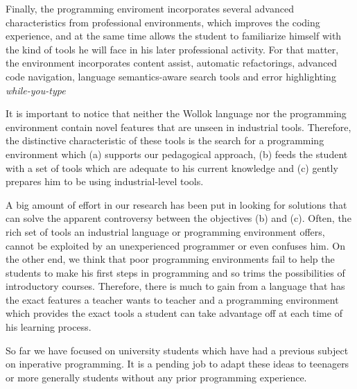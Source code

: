 Finally, the programming enviroment incorporates several advanced characteristics from professional environments, 
which improves the coding experience, and at the same time allows the student to familiarize himself with the kind of tools he will face in his later professional activity.
For that matter, the environment incorporates content assist, automatic refactorings, advanced code navigation, 
language semantics-aware search tools and error highlighting \emph{while-you-type}

\medskip
It is important to notice that neither the Wollok language nor the programming environment contain novel features that are unseen in industrial tools.
Therefore, the distinctive characteristic of these tools is the search for a programming environment which 
(a) supports our pedagogical approach,
(b) feeds the student with a set of tools which are adequate to his current knowledge
and (c) gently prepares him to be using industrial-level tools.

A big amount of effort in our research has been put in looking for solutions that can solve the apparent controversy between the objectives (b) and (c).
Often, the rich set of tools an industrial language or programming environment offers, cannot be exploited by an unexperienced programmer or even confuses him.
On the other end, we think that poor programming environments fail to help the students to make his first steps in programming and so trims the possibilities of introductory courses.
Therefore, there is much to gain from a language that has the exact features a teacher wants to teacher
and a programming environment which provides the exact tools a student can take advantage off at each time of his learning process.

So far we have focused on university students which have had a previous subject on inperative programming.
It is a pending job to adapt these ideas to teenagers or more generally students without any prior programming experience.
